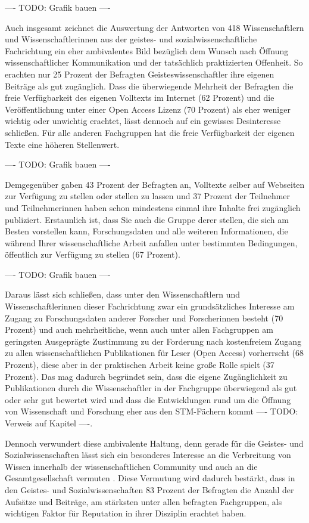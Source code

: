 ---- TODO: Grafik bauen ----

Auch insgesamt zeichnet die Auswertung der Antworten von 418 Wissenschaftlern und Wissenschaftlerinnen aus der geistes- und sozialwissenschaftliche Fachrichtung ein eher ambivalentes Bild bezüglich dem Wunsch nach Öffnung wissenschaftlicher Kommunikation und der tatsächlich praktizierten Offenheit. So erachten nur 25 Prozent der Befragten Geisteswissenschaftler ihre eigenen Beiträge als gut zugänglich. Dass die überwiegende Mehrheit der Befragten die freie Verfügbarkeit des eigenen Volltexts im Internet (62 Prozent) und die Veröffentlichung unter einer Open Access Lizenz (70 Prozent) als eher weniger wichtig oder unwichtig erachtet, lässt dennoch auf ein gewisses Desinteresse schließen. Für alle anderen Fachgruppen hat die freie Verfügbarkeit der eigenen Texte eine höheren Stellenwert.

---- TODO: Grafik bauen ----

Demgegenüber gaben 43 Prozent der Befragten an, Volltexte selber auf Webseiten zur Verfügung zu stellen oder stellen zu lassen und 37 Prozent der Teilnehmer und Teilnehmerinnen haben schon mindestens einmal ihre Inhalte frei zugänglich publiziert. Erstaunlich ist, dass Sie auch die Gruppe derer stellen, die sich am Besten vorstellen kann, Forschungsdaten und alle weiteren Informationen, die während Ihrer wissenschaftliche Arbeit anfallen unter bestimmten Bedingungen, öffentlich zur Verfügung zu stellen (67 Prozent).

---- TODO: Grafik bauen  ----

Daraus lässt sich schließen, dass unter den Wissenschaftlern und Wissenschaftlerinnen dieser Fachrichtung zwar ein grundsätzliches Interesse am Zugang zu Forschungsdaten anderer Forscher und Forscherinnen besteht (70 Prozent) und auch mehrheitliche, wenn auch unter allen Fachgruppen am geringsten Ausgeprägte Zustimmung zu der Forderung nach kostenfreiem Zugang zu allen wissenschaftlichen Publikationen für Leser (Open Access) vorherrscht (68 Prozent), diese aber in der praktischen Arbeit keine große Rolle spielt (37 Prozent). Das mag dadurch begründet sein, dass die eigene Zugänglichkeit zu Publikationen durch die Wissenschaftler in der Fachgruppe überwiegend als gut oder sehr gut bewertet wird und dass die Entwicklungen rund um die Öffnung von Wissenschaft und Forschung eher aus den STM-Fächern kommt ---- TODO: Verweis auf Kapitel ----.

Dennoch verwundert diese ambivalente Haltung, denn gerade für die Geistes- und Sozialwissenschaften lässt sich ein besonderes Interesse an die Verbreitung von Wissen innerhalb der wissenschaftlichen Community und auch an die Gesamtgesellschaft vermuten \cite{suchen}. Diese Vermutung wird dadurch bestärkt, dass in den Geistes- und Sozialwissenschaften 83 Prozent der Befragten die Anzahl der Aufsätze und Beiträge, am stärksten unter allen befragten Fachgruppen, als wichtigen Faktor für Reputation in ihrer Disziplin erachtet haben.

